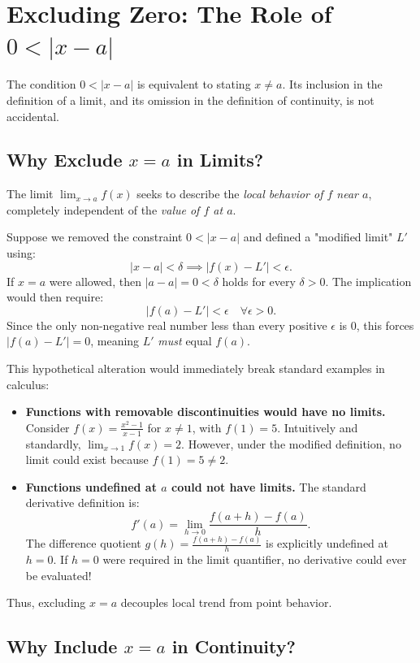 \documentclass{essay}
\begin{document}
\section{Excluding Zero: The Role of \(0 < |x - a|\)}

The condition \(0 < |x - a|\) is equivalent to stating \(x \neq a\). Its inclusion in the definition of a limit, and its omission in the definition of continuity, is not accidental.

\subsection{Why Exclude \(x = a\) in Limits?}

The limit \(\lim_{x \to a} f(x)\) seeks to describe the \emph{local behavior of \(f\) near \(a\)}, completely independent of the \emph{value of \(f\) at \(a\)}.

Suppose we removed the constraint \(0 < |x - a|\) and defined a "modified limit" \(L'\) using:
\[ |x - a| < \delta \implies |f(x) - L'| < \epsilon. \]
If \(x = a\) were allowed, then \(|a - a| = 0 < \delta\) holds for every \(\delta > 0\). The implication would then require:
\[ |f(a) - L'| < \epsilon \quad \forall \epsilon > 0. \]
Since the only non-negative real number less than every positive \(\epsilon\) is \(0\), this forces \(|f(a) - L'| = 0\), meaning \(L'\) \emph{must} equal \(f(a)\).

This hypothetical alteration would immediately break standard examples in calculus:
\begin{itemize}
  \item \textbf{Functions with removable discontinuities would have no limits.} Consider \(f(x) = \frac{x^{2} - 1}{x - 1}\) for \(x \neq 1\), with \(f(1) = 5\). Intuitively and standardly, \(\lim_{x \to 1} f(x) = 2\). However, under the modified definition, no limit could exist because \(f(1) = 5 \neq 2\).
  \item \textbf{Functions undefined at \(a\) could not have limits.} The standard derivative definition is:
    \[ f'(a) = \lim_{h \to 0} \frac{f(a+h) - f(a)}{h}. \]
    The difference quotient \(g(h) = \frac{f(a+h) - f(a)}{h}\) is explicitly undefined at \(h = 0\). If \(h = 0\) were required in the limit quantifier, no derivative could ever be evaluated!
\end{itemize}

Thus, excluding \(x = a\) decouples local trend from point behavior.

\subsection{Why Include \(x = a\) in Continuity?}
\end{document}
